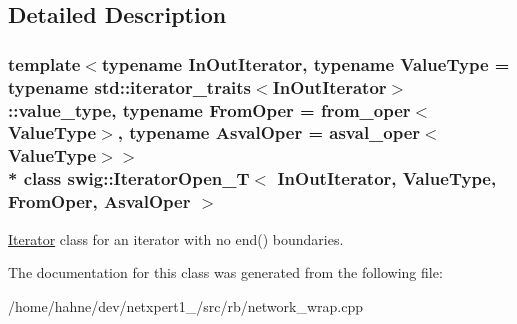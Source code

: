 \subsection{Detailed Description}
\subsubsection*{template$<$typename In\+Out\+Iterator, typename Value\+Type = typename std\+::iterator\+\_\+traits$<$\+In\+Out\+Iterator$>$\+::value\+\_\+type, typename From\+Oper = from\+\_\+oper$<$\+Value\+Type$>$, typename Asval\+Oper = asval\+\_\+oper$<$\+Value\+Type$>$$>$\\*
class swig\+::\+Iterator\+Open\+\_\+\+T$<$ In\+Out\+Iterator, Value\+Type, From\+Oper, Asval\+Oper $>$}

\hyperlink{structswig_1_1Iterator}{Iterator} class for an iterator with no end() boundaries. 

The documentation for this class was generated from the following file\+:\begin{DoxyCompactItemize}
\item 
/home/hahne/dev/netxpert1\+\_/src/rb/network\+\_\+wrap.\+cpp\end{DoxyCompactItemize}
